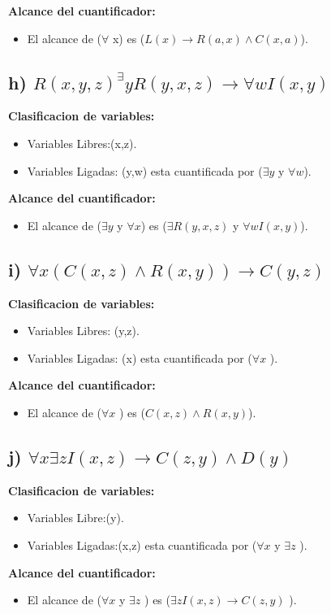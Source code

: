 \documentclass[11pt,letterpaper]{article}
\begin{document}
\textbf{Alcance del cuantificador:}
\begin{itemize}
    \item El alcance de ($\forall$ x) es ($L(x) \rightarrow R(a,x) \wedge C(x,a)$).
\end {itemize}

\subsection*{h) $R(x,y,z) ^ \exists y R(y,x,z) \rightarrow \forall w I(x,y)$}

\textbf{Clasificacion de variables:}
\begin{itemize}
    \item Variables Libres:(x,z).
    \item Variables Ligadas: (y,w) esta cuantificada por ($\exists y$ y $\forall w$).
\end{itemize}

\textbf{Alcance del cuantificador:}
\begin{itemize}
    \item El alcance de ($\exists y$ y $\forall x$) es ($\exists R(y,x,z)$ y $\forall w I(x,y)$).
\end{itemize}

\subsection*{i) $\forall x(C(x,z) \wedge  R(x,y)) \rightarrow C(y,z)$}

\textbf{Clasificacion de variables:}
\begin{itemize}
    \item Variables Libres: (y,z).
    \item Variables Ligadas: (x) esta cuantificada por ($\forall x$ ).
\end{itemize}

\textbf{Alcance del cuantificador:}
\begin{itemize}
    \item El alcance de ($\forall x$ ) es ($C(x,z) \wedge  R(x,y)$).
\end{itemize}
\subsection*{j) $\forall x \exists z I(x,z) \rightarrow C(z,y) \wedge  D(y)$}

\textbf{Clasificacion de variables:}
\begin{itemize}
    \item Variables Libre:(y).
    \item Variables Ligadas:(x,z) esta cuantificada por ($\forall x$ y $\exists z$ ).
\end{itemize}

\textbf{Alcance del cuantificador:}
\begin{itemize}
    \item El alcance de ($\forall x$ y $\exists z$ ) es ($\exists z I(x,z) \rightarrow C(z,y)$ ).
\end{itemize}
\end{document}

